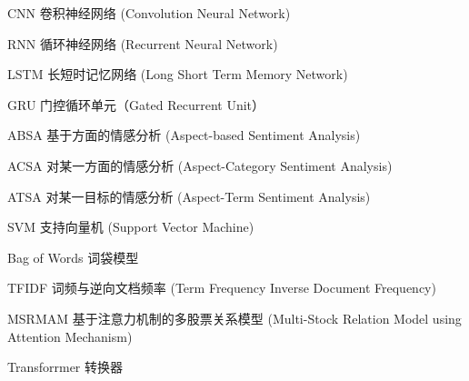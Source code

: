 \begin{denotation}[3cm]
\item[CNN] 卷积神经网络 (Convolution Neural Network)
\item[RNN] 循环神经网络 (Recurrent Neural Network) 
\item[LSTM] 长短时记忆网络 (Long Short Term Memory Network)
\item[GRU] 门控循环单元（Gated Recurrent Unit）
\item[ABSA] 基于方面的情感分析 (Aspect-based Sentiment Analysis)
\item[ACSA] 对某一方面的情感分析 (Aspect-Category Sentiment Analysis)
\item[ATSA] 对某一目标的情感分析 (Aspect-Term Sentiment Analysis)
\item[SVM] 支持向量机 (Support Vector Machine)
\item[Bag of Words] 词袋模型
\item[TFIDF] 词频与逆向文档频率 (Term Frequency Inverse Document Frequency)
\item[MSRMAM] 基于注意力机制的多股票关系模型 (Multi-Stock Relation Model using Attention Mechanism) 
\item[Transforrmer] 转换器
\end{denotation}
